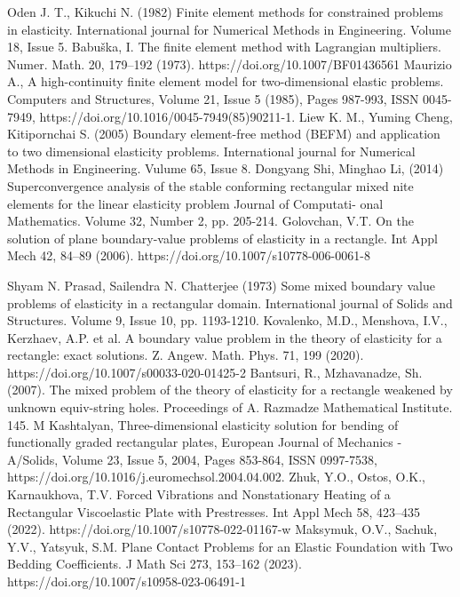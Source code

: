 \documentclass[a4paper,14pt]{extarticle}
\numberwithin{equation}{section}
\begin{document}
\begin{thebibliography}{1}
    Oden J. T., Kikuchi N. (1982) Finite element methods for constrained problems in elasticity. International journal for Numerical Methods in Engineering. Volume 18, Issue 5.
    Babuška, I. The finite element method with Lagrangian multipliers. Numer. Math. 20, 179–192 (1973). https://doi.org/10.1007/BF01436561
    Maurizio A., A high-continuity finite element model for two-dimensional elastic problems. Computers and Structures, Volume 21, Issue 5 (1985), Pages 987-993, ISSN 0045-7949, https://doi.org/10.1016/0045-7949(85)90211-1.
    Liew K. M., Yuming Cheng, Kitipornchai S. (2005) Boundary element-free method (BEFM) and application to two dimensional elasticity problems. International journal for Numerical Methods in Engineering. Vulume 65, Issue 8.
    Dongyang Shi, Minghao Li, (2014) Superconvergence analysis of the stable conforming rectangular mixed nite elements for the linear elasticity problem Journal of Computati- onal Mathematics. Volume 32, Number 2, pp. 205-214.
    Golovchan, V.T. On the solution of plane boundary-value problems of elasticity in a rectangle. Int Appl Mech 42, 84–89 (2006). https://doi.org/10.1007/s10778-006-0061-8
    
    Shyam N. Prasad, Sailendra N. Chatterjee (1973) Some mixed boundary value problems of elasticity in a rectangular domain. International journal of Solids and Structures. Volume 9, Issue 10, pp. 1193-1210.
    Kovalenko, M.D., Menshova, I.V., Kerzhaev, A.P. et al. A boundary value problem in the theory of elasticity for a rectangle: exact solutions. Z. Angew. Math. Phys. 71, 199 (2020). https://doi.org/10.1007/s00033-020-01425-2
    Bantsuri, R., Mzhavanadze, Sh. (2007). The mixed problem of the theory of elasticity for a rectangle weakened by unknown equiv-string holes. Proceedings of A. Razmadze Mathematical Institute. 145. 
    M Kashtalyan, Three-dimensional elasticity solution for bending of functionally graded rectangular plates, European Journal of Mechanics - A/Solids, Volume 23, Issue 5, 2004, Pages 853-864, ISSN 0997-7538, https://doi.org/10.1016/j.euromechsol.2004.04.002.
    Zhuk, Y.O., Ostos, O.K., Karnaukhova, T.V. Forced Vibrations and Nonstationary Heating of a Rectangular Viscoelastic Plate with Prestresses. Int Appl Mech 58, 423–435 (2022). https://doi.org/10.1007/s10778-022-01167-w
    Maksymuk, O.V., Sachuk, Y.V., Yatsyuk, S.M. Plane Contact Problems for an Elastic Foundation with Two Bedding Coefficients. J Math Sci 273, 153–162 (2023). https://doi.org/10.1007/s10958-023-06491-1


\end{thebibliography}
\end{document}
